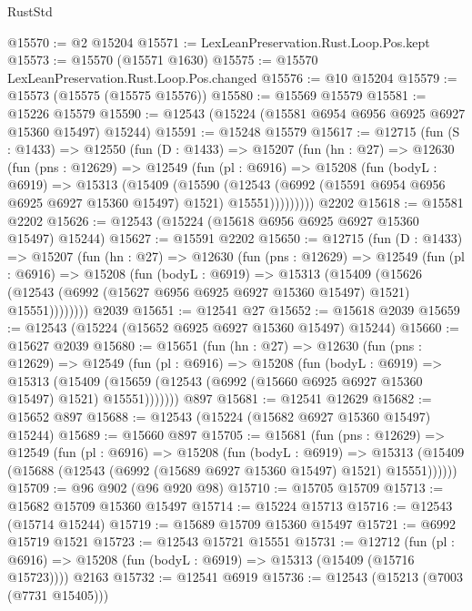 \begin{lexlean}{RustStd}
\begin{coremodule}
@15570 := @2 @15204
@15571 := LexLeanPreservation.Rust.Loop.Pos.kept
@15573 := @15570 (@15571 @1630)
@15575 := @15570 LexLeanPreservation.Rust.Loop.Pos.changed
@15576 := @10 @15204
@15579 := @15573 (@15575 (@15575 @15576))
@15580 := @15569 @15579
@15581 := @15226 @15579
@15590 := @12543 (@15224 (@15581 @6954 @6956 @6925 @6927 @15360 @15497) @15244)
@15591 := @15248 @15579
@15617 := @12715
    (fun (S : @1433) =>
    @12550
      (fun (D : @1433) =>
      @15207
        (fun (hn : @27) =>
        @12630
          (fun (pns : @12629) =>
          @12549
            (fun (pl : @6916) =>
            @15208
              (fun (bodyL : @6919) =>
              @15313
                (@15409
                  (@15590
                    (@12543
                      (@6992 (@15591 @6954 @6956 @6925 @6927 @15360 @15497) @1521)
                      @15551)))))))))
    @2202
@15618 := @15581 @2202
@15626 := @12543 (@15224 (@15618 @6956 @6925 @6927 @15360 @15497) @15244)
@15627 := @15591 @2202
@15650 := @12715
    (fun (D : @1433) =>
    @15207
      (fun (hn : @27) =>
      @12630
        (fun (pns : @12629) =>
        @12549
          (fun (pl : @6916) =>
          @15208
            (fun (bodyL : @6919) =>
            @15313
              (@15409
                (@15626
                  (@12543 (@6992 (@15627 @6956 @6925 @6927 @15360 @15497) @1521) @15551))))))))
    @2039
@15651 := @12541 @27
@15652 := @15618 @2039
@15659 := @12543 (@15224 (@15652 @6925 @6927 @15360 @15497) @15244)
@15660 := @15627 @2039
@15680 := @15651
    (fun (hn : @27) =>
    @12630
      (fun (pns : @12629) =>
      @12549
        (fun (pl : @6916) =>
        @15208
          (fun (bodyL : @6919) =>
          @15313
            (@15409 (@15659 (@12543 (@6992 (@15660 @6925 @6927 @15360 @15497) @1521) @15551)))))))
    @897
@15681 := @12541 @12629
@15682 := @15652 @897
@15688 := @12543 (@15224 (@15682 @6927 @15360 @15497) @15244)
@15689 := @15660 @897
@15705 := @15681
    (fun (pns : @12629) =>
    @12549
      (fun (pl : @6916) =>
      @15208
        (fun (bodyL : @6919) =>
        @15313 (@15409 (@15688 (@12543 (@6992 (@15689 @6927 @15360 @15497) @1521) @15551))))))
@15709 := @96 @902 (@96 @920 @98)
@15710 := @15705 @15709
@15713 := @15682 @15709 @15360 @15497
@15714 := @15224 @15713
@15716 := @12543 (@15714 @15244)
@15719 := @15689 @15709 @15360 @15497
@15721 := @6992 @15719 @1521
@15723 := @12543 @15721 @15551
@15731 := @12712
    (fun (pl : @6916) => @15208 (fun (bodyL : @6919) => @15313 (@15409 (@15716 @15723))))
    @2163
@15732 := @12541 @6919
@15736 := @12543 (@15213 (@7003 (@7731 @15405)))

\end{coremodule}
\end{lexlean}
